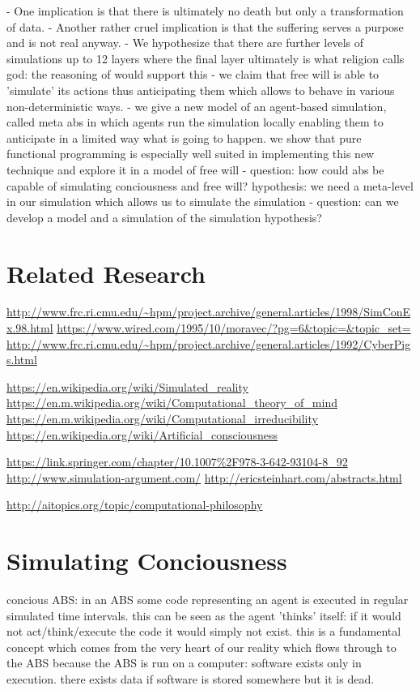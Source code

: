 \documentclass[twocolumn]{article}
\begin{document}
- One implication is that there is ultimately no death but only a transformation of data.
- Another rather cruel implication is that the suffering serves a purpose and is not real anyway.
- We hypothesize that there are further levels of simulations up to 12 layers where the final layer ultimately is what religion calls god: the reasoning of \cite{steinhart_theological_2010} would support this
- we claim that free will is able to 'simulate' its actions thus anticipating them which allows to behave in various non-deterministic ways.
- we give a new model of an agent-based simulation, called meta abs in which agents run the simulation locally enabling them to anticipate in a limited way what is going to happen. we show that pure functional programming is especially well suited in implementing this new technique and explore it in a model of free will
- question: how could abs be capable of simulating conciousness and free will? hypothesis: we need a meta-level in our simulation which allows us to simulate the simulation
- question: can we develop a model and a simulation of the simulation hypothesis?\\

\section{Related Research}
\url{http://www.frc.ri.cmu.edu/~hpm/project.archive/general.articles/1998/SimConEx.98.html}
\url{https://www.wired.com/1995/10/moravec/?pg=6&topic=&topic_set=}
\url{http://www.frc.ri.cmu.edu/~hpm/project.archive/general.articles/1992/CyberPigs.html}

\url{https://en.wikipedia.org/wiki/Simulated_reality}
\url{https://en.m.wikipedia.org/wiki/Computational_theory_of_mind}
\url{https://en.m.wikipedia.org/wiki/Computational_irreducibility}
\url{https://en.wikipedia.org/wiki/Artificial_consciousness}

\url{https://link.springer.com/chapter/10.1007%2F978-3-642-93104-8_92}
\url{http://www.simulation-argument.com/}
\url{http://ericsteinhart.com/abstracts.html}

\url{http://aitopics.org/topic/computational-philosophy}

\section{Simulating Conciousness}
concious ABS: in an ABS some code representing an agent is executed in regular simulated time intervals. this can be seen as the agent 'thinks' itself: if it would not act/think/execute the code it would simply not exist. this is a fundamental concept which comes from the very heart of our reality which flows through to the ABS because the ABS is run on a computer: software exists only in execution. there exists data if software is stored somewhere but it is dead.
\end{document}
